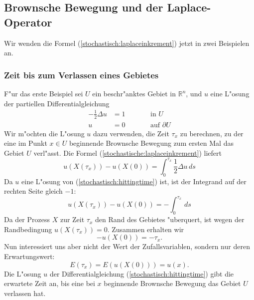 \subsection{Brownsche Bewegung und der Laplace-Operator}
Wir wenden die Formel (\ref{stochastisch:laplaceinkrement}) jetzt in
zwei Beispielen an.

\subsubsection{Zeit bis zum Verlassen eines Gebietes}
F"ur das erste Beispiel sei $U$ ein beschr"anktes Gebiet in
$\mathbb R^n$, und $u$ eine L"osung der partiellen Differentialgleichung
\begin{equation}
\begin{aligned}
-\frac12\Delta u&=1&\qquad&\text{in $U$}\\
               u&=0&      &\text{auf $\partial U$}
\end{aligned}
\label{stochastisch:hittingtime}
\end{equation}
Wir m"ochten die L"osung $u$ dazu verwenden, die Zeit $\tau_x$ zu berechnen,
zu der eine im Punkt $x\in U$ beginnende Brownsche Bewegung zum ersten
Mal das Gebiet $U$ verl"asst.
Die Formel (\ref{stochastische:laplaceinkrement}) liefert
\[
u(X(\tau_x))-u(X(0)) = \int_0^{\tau_x} \frac12\Delta u\,ds
\]
Da $u$ eine L"osung von (\ref{stochastisch:hittingtime}) ist, ist der 
Integrand auf der rechten Seite gleich $-1$:
\[
u(X(\tau_x))-u(X(0)) = -\int_0^{\tau_x} \,ds
\]
Da der Prozess $X$ zur Zeit $\tau_x$ den Rand des Gebietes "uberquert,
ist wegen der Randbedingung $u(X(\tau_x))=0$. 
Zusammen erhalten wir
\[
-u(X(0)) = -\tau_x.
\]
Nun interessiert uns aber nicht der Wert der Zufallsvariablen, sondern
nur deren Erwartungswert:
\[
E(\tau_x)=E(u(X(0)))=u(x).
\]
Die L"osung $u$ der Differentialgleichung (\ref{stochastisch:hittingtime})
gibt die erwartete Zeit an, bis eine bei $x$ beginnende Brownsche Bewegung 
das Gebiet $U$ verlassen hat.

